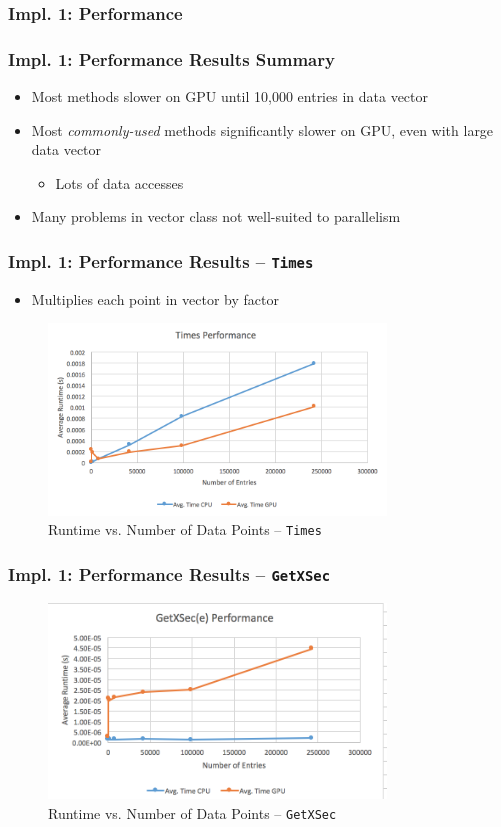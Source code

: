 \documentclass{beamer}
\newcommand{\textapprox}{\raisebox{0.5ex}{\texttildelow}}
\begin{document}
\subsubsection{Impl. 1: Performance}
\begin{frame}
\frametitle{Impl. 1: Performance Results Summary}
\begin{itemize}
\item Most methods slower on GPU until \textapprox 10,000 entries in data vector
\item Most \emph{commonly-used} methods significantly slower on GPU, even with large data vector
\begin{itemize}
\item Lots of data accesses
\end{itemize}
\item Many problems in vector class not well-suited to parallelism
\end{itemize}
\end{frame}

\begin{frame}
\frametitle{Impl. 1: Performance Results -- \texttt{Times}}
\begin{itemize}
\item Multiplies each point in vector by factor
\end{itemize}
\begin{figure}
\centering
\includegraphics[width=0.8\textwidth]{images/times_line.png}
\caption{Runtime vs. Number of Data Points -- \texttt{Times}}
\end{figure}
\end{frame}

\begin{frame}
\frametitle{Impl. 1: Performance Results -- \texttt{GetXSec}}
\begin{figure}
\centering
\includegraphics[width=0.8\textwidth]{images/getxsec_e_line.png}
\caption{Runtime vs. Number of Data Points -- \texttt{GetXSec}}
\end{figure}
\end{frame}
\end{document}
